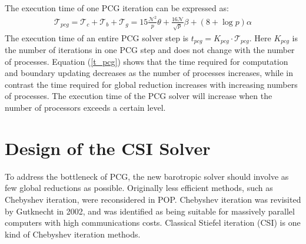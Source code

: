 \documentclass{sig-alternate}
\begin{document}
The execution time of one PCG iteration can be expressed as:
\begin{eqnarray}
\label{t_pcg}
\mathcal{T}_{pcg}=\mathcal{T}_c + \mathcal{T}_b+\mathcal{T}_g = 15 \frac{\mathcal{N}^2}{p}\theta + \frac{16\mathcal{N}}{\sqrt{p}}\beta +(8+\log p)\alpha
\end{eqnarray}
The execution time of an entire PCG solver step is $t_{pcg} = K_{pcg}\cdot \mathcal{T}_{pcg}$. Here $K_{pcg}$ is the number of iterations in one PCG step and does not change with the number of processes. Equation (\ref{t_pcg}) shows that the time required for computation and boundary updating decreases as the number of processes increases, while in contrast the time required for global reduction increases with increasing numbers of processes. The execution time of the PCG solver will increase when the number of processors exceeds a certain level.


\section{Design of the CSI Solver} \label{se:csi}
To address the bottleneck of PCG, the new barotropic solver should involve as few global reductions as possible. Originally less efficient methods, such as Chebyshev iteration, were reconsidered in POP. Chebyshev iteration was revisited by Gutknecht \cite{gutknecht2002chebyshev} in 2002, and was identified as being suitable for massively parallel computers with high communications costs. Classical Stiefel iteration (CSI) is one kind of Chebyshev iteration methods.
\end{document}

